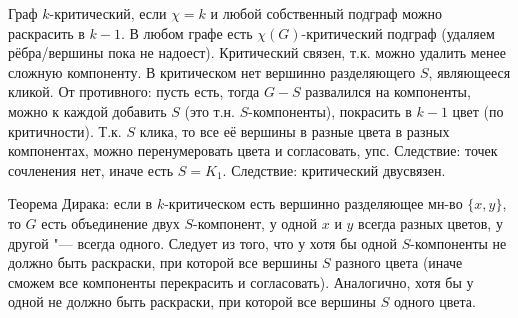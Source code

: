 	Граф $k$-критический, если $\chi=k$ и любой собственный подграф можно раскрасить в $k-1$.
	В любом графе есть $\chi(G)$-критический подграф (удаляем рёбра/вершины пока не надоест).
	Критический связен, т.к. можно удалить менее сложную компоненту.
	В критическом нет вершинно разделяющего $S$, являющееся кликой.
	От противного: пусть есть, тогда $G-S$ развалился на компоненты, можно к каждой добавить $S$ (это т.н. $S$-компоненты), покрасить в $k-1$ цвет (по критичности).
	Т.к. $S$ клика, то все её вершины в разные цвета в разных компонентах, можно перенумеровать цвета и согласовать, упс.
	Следствие: точек сочленения нет, иначе есть $S=K_1$.
	Следствие: критический двусвязен.

	Теорема Дирака: если в $k$-критическом есть вершинно разделяющее мн-во $\{x, y\}$, то
	$G$ есть объединение двух $S$-компонент, у одной $x$ и $y$ всегда разных цветов, у другой "--- всегда одного.
	Следует из того, что у хотя бы одной $S$-компоненты не должно быть раскраски, при которой все вершины $S$ разного цвета
	(иначе сможем все компоненты перекрасить и согласовать).
	Аналогично, хотя бы у одной не должно быть раскраски, при которой все вершины $S$ одного цвета.
